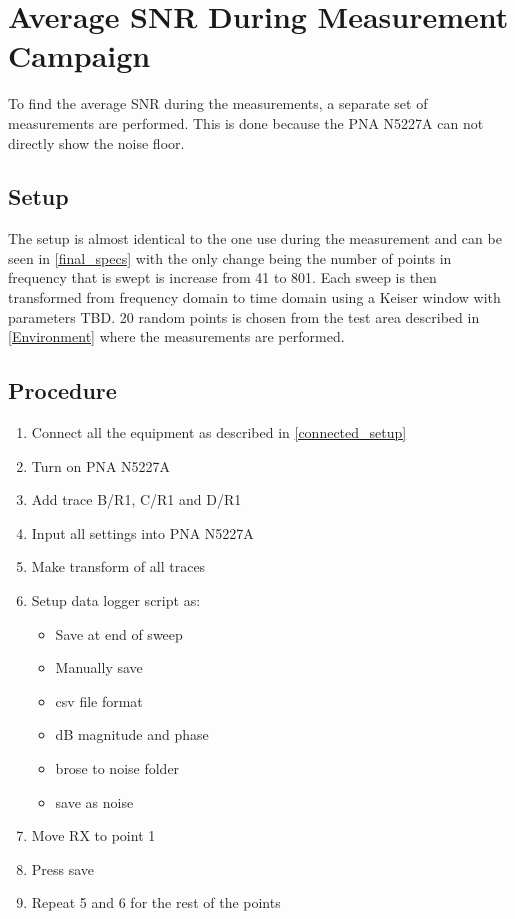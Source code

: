 \section{Average SNR During Measurement Campaign}
\label{app:SNR}

To find the average SNR during the measurements, a separate set of measurements are performed. This is done because the PNA N5227A can not directly show the noise floor. 

\subsection{Setup}
The setup is almost identical to the one use during the measurement and can be seen in \autoref{final_specs} with the only change being the number of points in frequency that is swept is increase from 41 to 801. Each sweep is then transformed from frequency domain to time domain using a Keiser window with parameters TBD. 20 random points is chosen from the test area described in \autoref{Environment} where the measurements are performed. 

\subsection{Procedure}
\begin{enumerate}
	\item Connect all the equipment as described in \autoref{connected_setup}
	\item Turn on PNA N5227A
	\item Add trace B/R1, C/R1 and D/R1  
	\item Input all settings into PNA N5227A
	\item Make transform of all traces
	\item Setup data logger script as:
	\begin{itemize}
		\item Save at end of sweep
		\item Manually save
		\item csv file format
		\item dB magnitude and phase
		\item brose to noise folder
		\item save as noise
	\end{itemize}
	\item Move RX to point 1
	\item Press save
	\item Repeat 5 and 6 for the rest of the points	
\end{enumerate}


